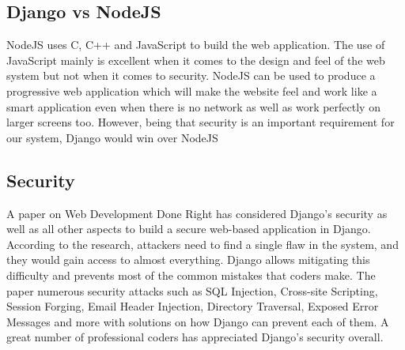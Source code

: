\documentclass[../main.tex]{subfiles}
\begin{document}
\subsection{Django vs NodeJS} 
NodeJS\cite{nodejs} uses C, C++ and JavaScript to build the web application. The use of JavaScript mainly is excellent when it comes to the design and feel of the web system but not when it comes to security. NodeJS can be used to produce a progressive web application which will make the website feel and work like a smart application even when there is no network as well as work perfectly on larger screens too. However, being that security is an important requirement for our system, Django would win over NodeJS\cite{nodejsdjango}

\subsection{Security}
A paper on Web Development Done Right\cite{Holovaty2007TheDG} has considered Django's security as well as all other aspects to build a secure web-based application in Django. According to the research, attackers need to find a single flaw in the system, and they would gain access to almost everything. Django allows mitigating this difficulty and prevents most of the common mistakes that coders make. The paper numerous security attacks such as SQL Injection, Cross-site Scripting, Session Forging, Email Header Injection, Directory Traversal, Exposed Error Messages and more with solutions on how Django can prevent each of them. A great number of professional coders has appreciated Django's security overall.
\end{document}
